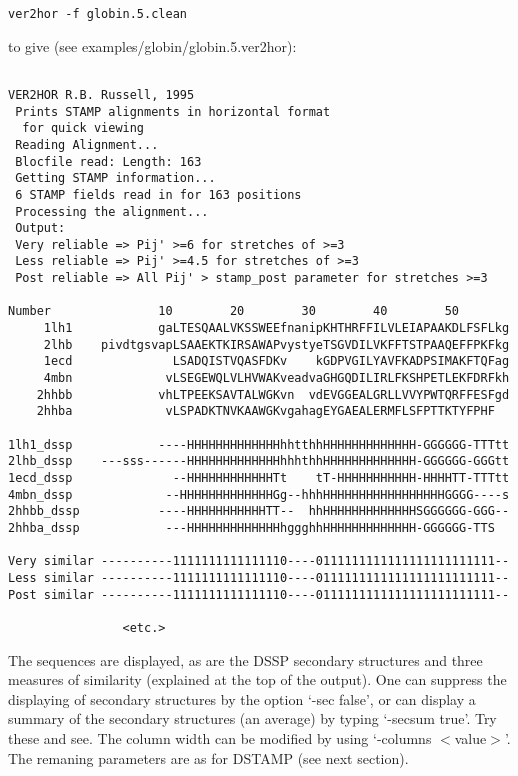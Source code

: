 \begin{scriptsize}\begin{verbatim}
ver2hor -f globin.5.clean 
\end{verbatim} \end{scriptsize}

to give (see examples/globin/globin.5.ver2hor):\\

\begin{scriptsize}\begin{verbatim}

VER2HOR R.B. Russell, 1995
 Prints STAMP alignments in horizontal format
  for quick viewing
 Reading Alignment...
 Blocfile read: Length: 163
 Getting STAMP information...
 6 STAMP fields read in for 163 positions 
 Processing the alignment...
 Output:
 Very reliable => Pij' >=6 for stretches of >=3
 Less reliable => Pij' >=4.5 for stretches of >=3
 Post reliable => All Pij' > stamp_post parameter for stretches >=3

Number               10        20        30        40        50    
     1lh1            gaLTESQAALVKSSWEEfnanipKHTHRFFILVLEIAPAAKDLFSFLkg
     2lhb    pivdtgsvapLSAAEKTKIRSAWAPvystyeTSGVDILVKFFTSTPAAQEFFPKFkg
     1ecd              LSADQISTVQASFDKv    kGDPVGILYAVFKADPSIMAKFTQFag
     4mbn             vLSEGEWQLVLHVWAKveadvaGHGQDILIRLFKSHPETLEKFDRFkh
    2hhbb            vhLTPEEKSAVTALWGKvn  vdEVGGEALGRLLVVYPWTQRFFESFgd
    2hhba             vLSPADKTNVKAAWGKvgahagEYGAEALERMFLSFPTTKTYFPHF  

1lh1_dssp            ----HHHHHHHHHHHHHhhtthhHHHHHHHHHHHHH-GGGGGG-TTTtt
2lhb_dssp    ---sss------HHHHHHHHHHHHHhhhthhHHHHHHHHHHHHH-GGGGGG-GGGtt
1ecd_dssp              --HHHHHHHHHHHHTt    tT-HHHHHHHHHHH-HHHHTT-TTTtt
4mbn_dssp             --HHHHHHHHHHHHHGg--hhhHHHHHHHHHHHHHHHHHGGGG----s
2hhbb_dssp           ----HHHHHHHHHHHTT--  hhHHHHHHHHHHHHHSGGGGGG-GGG--
2hhba_dssp            ---HHHHHHHHHHHHHhggghhHHHHHHHHHHHHH-GGGGGG-TTS  

Very similar ----------1111111111111110----0111111111111111111111111--
Less similar ----------1111111111111110----0111111111111111111111111--
Post similar ----------1111111111111110----0111111111111111111111111--

				<etc.>

\end{verbatim} \end{scriptsize}

The sequences are displayed, as are the DSSP secondary structures and three
measures of similarity (explained at the top of the output).  One can suppress
the displaying of secondary structures by the option `-sec false', or can display 
a summary of the secondary structures (an average) by typing `-secsum true'.  Try 
these and see.  The column width can be modified by using `-columns $<$value$>$'.  The
remaning parameters are as for DSTAMP (see next section).

